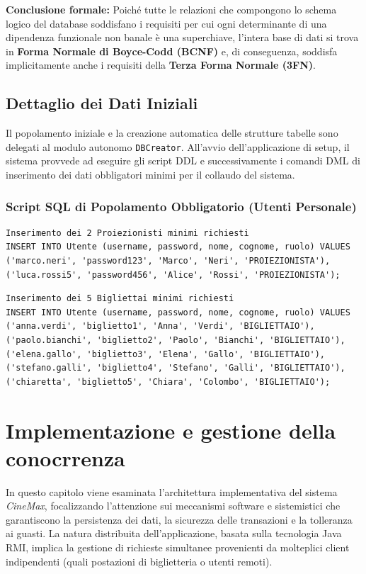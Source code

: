 \documentclass{article}
\begin{document}
\textbf{Conclusione formale:} Poiché tutte le relazioni che compongono lo schema logico del database soddisfano i requisiti per cui ogni determinante di una dipendenza funzionale non banale è una superchiave, l'intera base di dati si trova in \textbf{Forma Normale di Boyce-Codd (BCNF)} e, di conseguenza, soddisfa implicitamente anche i requisiti della \textbf{Terza Forma Normale (3FN)}.

\subsection{Dettaglio dei Dati Iniziali}
Il popolamento iniziale e la creazione automatica delle strutture tabelle sono delegati al modulo autonomo \texttt{DBCreator}. All'avvio dell'applicazione di setup, il sistema provvede ad eseguire gli script DDL e successivamente i comandi DML di inserimento dei dati obbligatori minimi per il collaudo del sistema.

\subsubsection{Script SQL di Popolamento Obbligatorio (Utenti Personale)}
\begin{verbatim}
Inserimento dei 2 Proiezionisti minimi richiesti
INSERT INTO Utente (username, password, nome, cognome, ruolo) VALUES
('marco.neri', 'password123', 'Marco', 'Neri', 'PROIEZIONISTA'),
('luca.rossi5', 'password456', 'Alice', 'Rossi', 'PROIEZIONISTA');
\end{verbatim}
\begin{verbatim}
Inserimento dei 5 Bigliettai minimi richiesti
INSERT INTO Utente (username, password, nome, cognome, ruolo) VALUES
('anna.verdi', 'biglietto1', 'Anna', 'Verdi', 'BIGLIETTAIO'),
('paolo.bianchi', 'biglietto2', 'Paolo', 'Bianchi', 'BIGLIETTAIO'),
('elena.gallo', 'biglietto3', 'Elena', 'Gallo', 'BIGLIETTAIO'),
('stefano.galli', 'biglietto4', 'Stefano', 'Galli', 'BIGLIETTAIO'),
('chiaretta', 'biglietto5', 'Chiara', 'Colombo', 'BIGLIETTAIO');
\end{verbatim}


\section{Implementazione e gestione della conocrrenza}
In questo capitolo viene esaminata l'architettura implementativa del sistema \textit{CineMax}, focalizzando l'attenzione sui meccanismi software e sistemistici che garantiscono la persistenza dei dati, la sicurezza delle transazioni e la tolleranza ai guasti. La natura distribuita dell'applicazione, basata sulla tecnologia Java RMI, implica la gestione di richieste simultanee provenienti da molteplici client indipendenti (quali postazioni di biglietteria o utenti remoti). 
\end{document}
